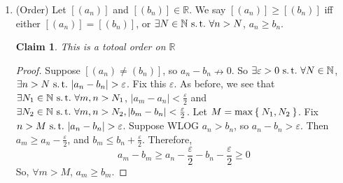 \documentclass[12pt]{amsart}
\newcommand{\bbR}{\mathbb{R}}
\newcommand{\bbN}{\mathbb{N}}
\newcommand{\suchthat}{\operatorname{\thinspace s.t. \thinspace}}
\theoremstyle{plain}
\newtheorem*{claim}{Claim}
\theoremstyle{remark}
\theoremstyle{definition}
\begin{document}
\begin{enumerate}[(1)]
\begin{proof}
				Notice that $b_n$ is Cauchy because the sequence $\frac{1}{a_n}$ is Cauchy. Moreover, we can compute $(a_n b_n)$
				\begin{itemize}[-]
					\item
						If $n \leq N$, $ a_n b_n = a_n$
					\item
						If $n > N$, $a_n b_n = 1$
				\end{itemize}
				So $\forall n > N, a_n b_n = 1$. This means that $[(a_n b_n)] = 1$. Therefore every nonzero element of $\bbR$ has an inverse. 
		\end{proof}
		\item (Order)
		Let $[(a_n)]$ and $[(b_n)] \in \bbR$. We say $[(a_n)] \geqslant [(b_n)]$ iff either $[(a_n)] = [(b_n)]$, or $\exists N \in \bbN \suchthat \forall n > N$, $a_n \geqslant b_n$.
		\begin{claim}
			This is a totoal order on $\bbR$
		\end{claim}
		\begin{proof}
			Suppose $[(a_n) \neq (b_n)]$, so $a_n - b_n \nrightarrow 0$. So $\exists \varepsilon > 0 \suchthat \forall N\in \bbN$, $\exists n > N \suchthat |a_n - b_n| > \varepsilon$.
			\newline
			Fix this $\varepsilon$. As before, we see that $\exists N_1 \in \bbN \suchthat \forall m,n > N_1$, $|a_m - a_n| < \frac{\varepsilon}{2}$ and $\exists N_2\in \bbN \suchthat \forall m,n > N_2, |b_m - b_n| < \frac{\varepsilon}{2}$.
			\newline
			Let $M = \max\Set{N_1,N_2}$. Fix $n > M \suchthat |a_n - b_n| > \varepsilon$. Suppose WLOG $a_n > b_n$, so $a_n - b_n > \varepsilon$. Then $a_m \geqslant a_n - \frac{\varepsilon}{2}$, and $b_m \leqslant b_n + \frac{\varepsilon}{2}$. 
			\newline
			Therefore,
		\begin{equation*}
			a_m - b_m \geqslant a_n - \frac{\varepsilon}{2} - b_n - \frac{\varepsilon}{2} \geqslant 0
		\end{equation*}
		So, $\forall m > M$, $a_m \geqslant b_m$.
		\end{proof}


\end{enumerate}
\end{document}
